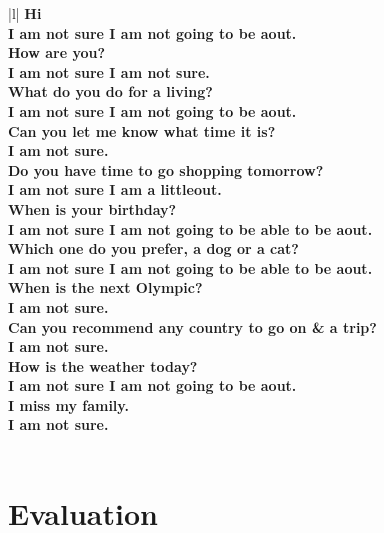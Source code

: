 \documentclass[11pt,a4paper]{article}
\begin{document}
\begin{table}[t!]
\begin{center}
\begin{tabular}{|l|}
\hline \bf 
Hi  \\ 
I am not sure I am not going to be aout.\\
\bf How are you?  
\\I am not sure I am not sure. 
\\ \bf What do you do for a living?
 \\ I am not sure I am not going to be aout.
\\ \bf Can you let me know what time it is?
 \\I am not sure.
 \\ \bf Do you have time to go shopping tomorrow?
 \\  I am not sure I am a littleout.
 \\
\bf When is your birthday? \\  
I am not sure I am not going to be able to be aout.
 \\
\bf Which one do you prefer, a dog or a cat?
\\I am not sure I am not going to be able to be aout.
\\
\bf When is the next Olympic?
 \\ I am not sure. \\
\bf Can you recommend any country to go on & \bf  a trip? 
\\  I am not sure.
\\
\bf How is the weather today?
\\ I am not sure I am not going to be aout.
\\
\bf I miss my family.
\\  I am not sure.
\\

 \\
\hline
\end{tabular}
\end{center}
\caption{the input and output of chat bot trained with mixed dataset, both Cornell Movie Corpus and Daily dialogue.}
\end{table}






\section{Evaluation}
\end{document}

